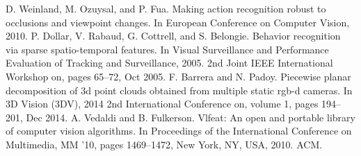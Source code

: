 \documentclass[a4paper, 10pt, conference]{ieeeconf}      %
\begin{document}
\begin{thebibliography}{99}
D. Weinland, M. Ozuysal, and P. Fua. Making action recognition robust to occlusions and viewpoint changes. In European Conference on Computer
Vision, 2010.
P. Dollar, V. Rabaud, G. Cottrell, and S. Belongie. Behavior recognition via
sparse spatio-temporal features. In Visual Surveillance and Performance Evaluation of Tracking and Surveillance, 2005. 2nd Joint IEEE International Workshop on, pages 65–72, Oct 2005. %
F. Barrera and N. Padoy. Piecewise planar decomposition of 3d point clouds
obtained from multiple static rgb-d cameras. In 3D Vision (3DV), 2014 2nd International Conference on, volume 1, pages 194–201, Dec 2014. 
A. Vedaldi and B. Fulkerson. Vlfeat: An open and portable library of
computer vision algorithms. In Proceedings of the International Conference on
Multimedia, MM ’10, pages 1469–1472, New York, NY, USA, 2010. ACM. 


\end{thebibliography}
\end{document}
